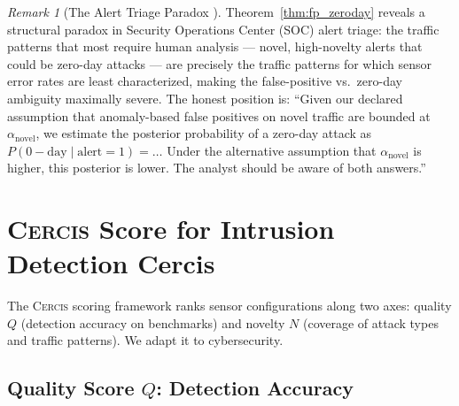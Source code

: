 \documentclass[11pt,a4paper]{article}
\theoremstyle{definition}
\theoremstyle{remark}
\newtheorem{remark}[theorem]{Remark}
\newcommand{\Cercis}{\textsc{Cercis}}
\newcommand{\alert}{\mathrm{alert}}
\newcommand{\zeroday}{\mathrm{0-day}}
\begin{document}
\begin{remark}[The Alert Triage Paradox ]
\label{rem:triage}
Theorem~\ref{thm:fp_zeroday} reveals a structural paradox in Security Operations Center (SOC) alert triage: the traffic patterns that most require human analysis — novel, high-novelty alerts that could be zero-day attacks — are precisely the traffic patterns for which sensor error rates are least characterized, making the false-positive vs.\ zero-day ambiguity maximally severe. The honest position is: ``Given our declared assumption that anomaly-based false positives on novel traffic are bounded at $\alpha_{\mathrm{novel}}$, we estimate the posterior probability of a zero-day attack as $P(\zeroday \mid \alert = 1) = \ldots$ Under the alternative assumption that $\alpha_{\mathrm{novel}}$ is higher, this posterior is lower. The analyst should be aware of both answers.''
\end{remark}

\section{\Cercis{} Score for Intrusion Detection Cercis}
\label{sec:cercis}

The \Cercis{} scoring framework ranks sensor configurations along two axes: quality $Q$ (detection accuracy on benchmarks) and novelty $N$ (coverage of attack types and traffic patterns). We adapt it to cybersecurity.

\subsection{Quality Score $Q$: Detection Accuracy }
\end{document}
